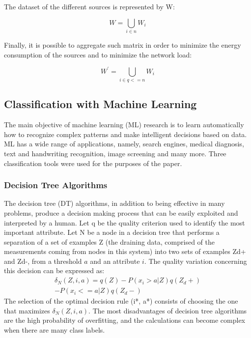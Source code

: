 \documentclass[draft, {\secondLanguage}, english]{volcanica-template}
\begin{document}
The dataset of the different sources is represented by W:

\begin{equation}
    W = \bigcup_{i \in n} W_i
\end{equation}

Finally, it is possible to aggregate such matrix in order to minimize the energy consumption of the sources and to minimize the network load:

\begin{equation}
    W^\prime = \bigcup_{i \in q<=n} W_i
\end{equation}

\subsection{Classification with Machine Learning}
The main objective of machine learning (ML) research is to learn automatically how to recognize complex patterns and make intelligent decisions based on data. ML has a wide range of applications, namely, search engines, medical diagnosis, text and handwriting recognition, image screening and many more. Three classification tools were used for the purposes of the paper.

\subsubsection{Decision Tree Algorithms}
The decision tree (DT) algorithms, in addition to being effective in many problems, produce a decision making process that can be easily exploited and interpreted by a human. Let q be the quality criterion used to identify the most important attribute. Let N be a node in a decision tree that performs a separation of a set of examples Z (the draining data, comprised of the measurements coming from nodes in this system) into two sets of examples Zd+ and Zd-, from a threshold $a$ and an attribute $i$. The quality variation concerning this decision can be expressed as:
\begin{multline}
    \delta_N(Z,i,a) = q(Z)-P(x_i>a|Z)q(Z_d+)\\
    - P(x_i<=a|Z)q(Z_d-)
\end{multline}
The selection of the optimal decision rule (i*, a*) consists of choosing the one that maximizes $\delta_N(Z,i,a)$. The most disadvantages of decision tree algorithms are the high probability of overfitting, and the calculations can become complex when there are many class labels.
\end{document}

